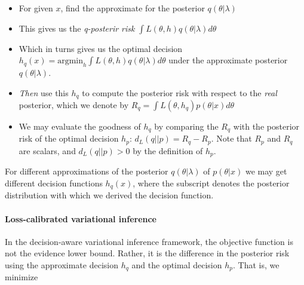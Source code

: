 \documentclass{article}
\begin{document}
\begin{itemize}
    \item For given $x$, find the approximate for the posterior $q(\theta|\lambda)$
    \item This gives us the \textit{q-posterir risk} $\int L(\theta, h) q(\theta|\lambda) d\theta$
    \item Which in turns gives us the optimal decision $h_q(x) = \mathrm{argmin}_h \int L(\theta, h) q(\theta|\lambda) d\theta$ under the approximate posterior $q(\theta|\lambda)$.
    \item \textit{Then} use this $h_q$ to compute the posterior risk with respect to the \textit{real} posterior, which we denote by $R_q = \int L(\theta, h_q) p(\theta|x) d\theta$
    \item We may evaluate the goodness of $h_q$ by comparing the $R_q$ with the posterior risk of the optimal decision $h_p$: $d_L(q||p) = R_q - R_p$. Note that $R_p$ and $R_q$ are scalars, and $d_L(q||p) > 0$ by the definition of $h_p$.
\end{itemize}

For different approximations of the posterior $q(\theta|\lambda)$ of $p(\theta|x)$ we may get different decision functions $h_q(x)$, where the subscript denotes the posterior distribution with which we derived the decision function. 




\paragraph{Loss-calibrated variational inference}
In the decision-aware variational inference framework, the objective function is not the evidence lower bound. Rather, it is the difference in the posterior risk using the approximate decision $h_q$ and the optimal decision $h_p$. That is, we minimize
\end{document}
